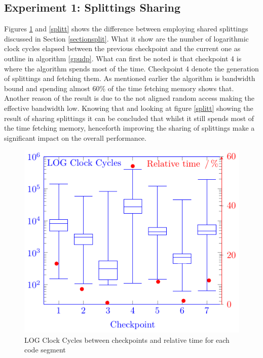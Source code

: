 \documentclass{llncs}
\begin{document}
% 
%
%
%
\subsection{Experiment 1: Splittings Sharing} %
Figures \ref{nosplitt} and \ref{splitt} shows the difference between employing  shared splittings discussed in Section \ref{sectionsplit}. 
What it show are the number of logarithmic clock cycles elapsed between the 
previous checkpoint and the current one as outline in algorithm \ref{gpudp}.
What can first be noted is that checkpoint 4 is where the algorithm spends most of the time. 
Checkpoint 4 denote the generation of splittings and fetching them.
As mentioned earlier the algorithm is bandwidth bound and spending almost
$60\%$ of the time fetching memory shows that. Another reason of the result
is due to the not aligned random access making the effective bandwidth low.
Knowing that and looking at figure \ref{splitt} showing the result of sharing splittings it can be concluded that whilst it still spends most  of the time fetching memory, henceforth improving the sharing of splittings make a significant impact on the overall performance.
\begin{figure}[htbp]\centering
\includegraphics[width=0.8\columnwidth]{fig3cycles}
\caption{LOG Clock Cycles between checkpoints and relative time for each code segment\label{nosplitt}}
\end{figure}
\end{document}
